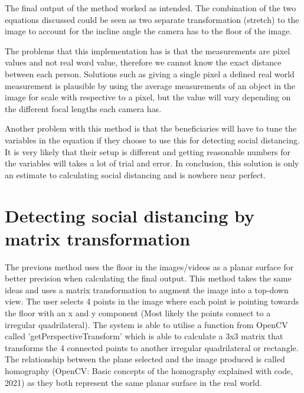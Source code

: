 \documentclass[12pt]{report}
\begin{document}
The final output of the method worked as intended. The combination of the two equations discussed could be seen as two separate transformation (stretch) to the image to account for the incline angle the camera has to the floor of the image.
\vspace{2mm}

The problems that this implementation has is that the measurements are pixel values and not real word value, therefore we cannot know the exact distance between each person. Solutions such as giving a single pixel a defined real world measurement is plausible by using the average measurements of an object in the image for scale with respective to a pixel, but the value will vary depending on the different focal lengths each camera has.

\vspace{2mm}

Another problem with this method is that the beneficiaries will have to tune the variables in the equation if they choose to use this for detecting social distancing. It is very likely that their setup is different and getting reasonable numbers for the variables will takes a lot of trial and error. 
In conclusion, this solution is only an estimate to calculating social distancing and is nowhere near perfect. 

\section{Detecting social distancing by matrix transformation}

The previous method uses the floor in the images/videos as a planar surface for better precision when calculating the final output. This method takes the same ideas and uses a matrix transformation to augment the image into a top-down view. The user selects 4 points in the image where each point is pointing towards the floor with an x and y component (Most likely the points connect to a irregular quadrilateral). The system is able to utilise a function from OpenCV called 'getPerspectiveTransform' which is able to calculate a 3x3 matrix that transforms the 4 connected points to another irregular quadrilateral or rectangle. The relationship between the plane selected and the image produced is called homography (OpenCV: Basic concepts of the homography explained with code, 2021) as they both represent the same planar surface in the real world.

\vspace{2mm}
\end{document}
